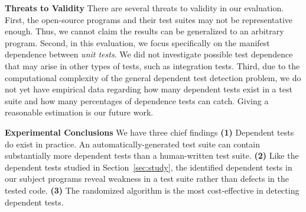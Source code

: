 \vspace{1mm}
\noindent \textbf{Threats to Validity}
There are several threats to validity in our evaluation.
First, the \subjnum open-source
programs and their test suites may not be
representative enough. Thus, we cannot claim the results
can be generalized to an arbitrary program.
Second, in this evaluation, we focus specifically on
the {manifest dependence} between \textit{unit tests}.
We did not investigate possible test dependence that may arise
in other types of tests, such as integration tests.
Third, due to the computational complexity of the general dependent test
detection problem, we do not yet have
empirical data regarding how many dependent
tests exist in a test suite and how many percentages of dependence tests
\ourtool can catch.  Giving a reasonable estimation is our future work.


\vspace{1mm}

\noindent \textbf{Experimental Conclusions}
We have three chief findings \textbf{(1)}
Dependent tests do exist in practice.
An automatically-generated test suite can contain
substantially more dependent tests than a human-written
test suite.
\textbf{(2)} Like the dependent tests
studied in Section~\ref{sec:study}, the identified
dependent tests in our subject programs reveal weakness
in a test suite rather than defects in the tested code.
\textbf{(3)} The randomized algorithm is the
most cost-effective in detecting dependent tests.


